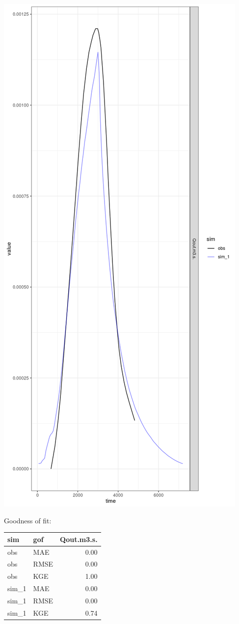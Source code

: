 \documentclass[
]{article}
\begin{document}
\includegraphics{Borden_v1_files/figure-latex/Comparison-1.png}

Goodness of fit:

\begin{longtable}[]{@{}llr@{}}
\toprule
sim & gof & Qout.m3.s.\tabularnewline
\midrule
\endhead
obs & MAE & 0.00\tabularnewline
obs & RMSE & 0.00\tabularnewline
obs & KGE & 1.00\tabularnewline
sim\_1 & MAE & 0.00\tabularnewline
sim\_1 & RMSE & 0.00\tabularnewline
sim\_1 & KGE & 0.74\tabularnewline
\bottomrule
\end{longtable}
\end{document}
